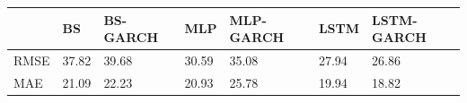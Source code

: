 \begin{tabular}{lllllll}
\toprule
 & BS & BS-GARCH & MLP & MLP-GARCH & LSTM & LSTM-GARCH \\
\midrule
RMSE & 37.82 & 39.68 & 30.59 & 35.08 & 27.94 & 26.86 \\
MAE & 21.09 & 22.23 & 20.93 & 25.78 & 19.94 & 18.82 \\
\bottomrule
\end{tabular}
